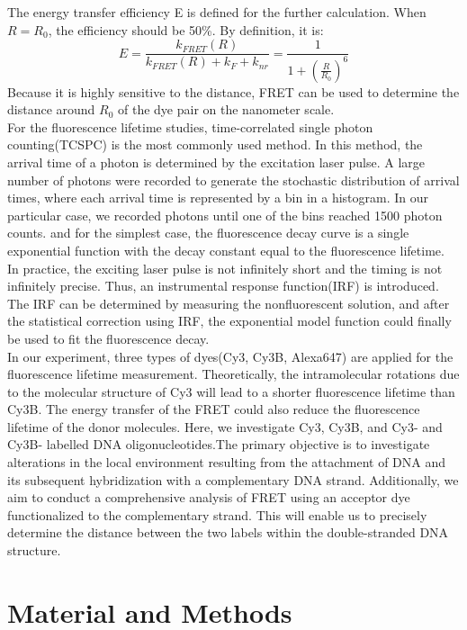 \documentclass[a4paper,english,12pt,bibliography=totoc]{scrreprt}
\begin{document}
The energy transfer efficiency E is defined for the further calculation. When $R = R_0$, the efficiency should be 50\%. By definition, it is:
\[
E = \frac{k_{FRET}(R)}{k_{FRET}(R) + k_F + k_{nr}} = \frac{1}{1+(\frac{R}{R_0})^6}
\]
Because it is highly sensitive to the distance, FRET can be used to determine the distance around $R_0$ of the dye pair on the nanometer scale.\\

For the fluorescence lifetime studies, time-correlated single photon counting(TCSPC) is the most commonly used method. In this method, the arrival time of a photon is determined by the excitation laser pulse. A large number of photons were recorded to generate the stochastic distribution of arrival times, where each arrival time is represented by a bin in a histogram. In our particular case, we recorded photons until one of the bins reached 1500 photon counts. and for the simplest case, the fluorescence decay curve is a single exponential function with the decay constant equal to the fluorescence lifetime.\\

In practice, the exciting laser pulse is not infinitely short and the timing is not infinitely precise. Thus, an instrumental response function(IRF) is introduced. The IRF can be determined by measuring the nonfluorescent solution, and after the statistical correction using IRF, the exponential model function could finally be used to fit the fluorescence decay.\\


In our experiment, three types of dyes(Cy3, Cy3B, Alexa647) are applied for the fluorescence lifetime measurement. Theoretically, the intramolecular rotations due to the molecular structure of Cy3 will lead to a shorter fluorescence lifetime than Cy3B. The energy transfer of the FRET could also reduce the fluorescence lifetime of the donor molecules. Here, we investigate Cy3, Cy3B, and Cy3- and Cy3B- labelled DNA oligonucleotides.The primary objective is to investigate alterations in the local environment resulting from the attachment of DNA and its subsequent hybridization with a complementary DNA strand. Additionally, we aim to conduct a comprehensive analysis of FRET using an acceptor dye functionalized to the complementary strand. This will enable us to precisely determine the distance between the two labels within the double-stranded DNA structure.



\chapter{Material and Methods}
\label{cha:MaterialandMethods}
\end{document}
